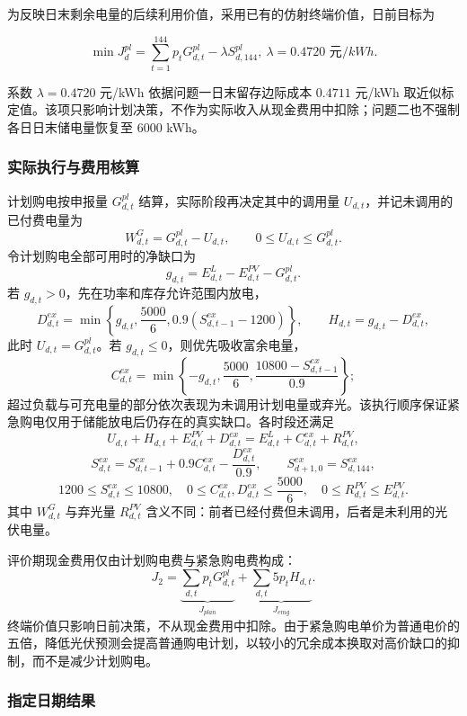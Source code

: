 \documentclass[withoutpreface,bwprint]{cumcmthesis}
\begin{document}
为反映日末剩余电量的后续利用价值，采用已有的仿射终端价值，日前目标为

\begin{equation}\min J_{d}^{pl} = \sum_{t = 1}^{144}p_{t}G_{d,t}^{pl} - \lambda S_{d,144}^{pl},\ \lambda = 0.4720\text{~元}/kWh.\end{equation}

系数 \(\lambda=0.4720\) 元/kWh 依据问题一日末留存边际成本 \(0.4711\) 元/kWh 取近似标定值。该项只影响计划决策，不作为实际收入从现金费用中扣除；问题二也不强制各日日末储电量恢复至 6000 kWh。

\subsubsection{实际执行与费用核算}

计划购电按申报量 \(G_{d,t}^{pl}\) 结算，实际阶段再决定其中的调用量
\(U_{d,t}\)，并记未调用的已付费电量为
\[
W_{d,t}^{G}=G_{d,t}^{pl}-U_{d,t},\qquad 0\le U_{d,t}\le G_{d,t}^{pl}.
\]
令计划购电全部可用时的净缺口为
\[
g_{d,t}=E_{d,t}^{L}-E_{d,t}^{PV}-G_{d,t}^{pl}.
\]
若 \(g_{d,t}>0\)，先在功率和库存允许范围内放电，
\[
D_{d,t}^{ex}=\min\left\{g_{d,t},\frac{5000}{6},
0.9\left(S_{d,t-1}^{ex}-1200\right)\right\},\qquad
H_{d,t}=g_{d,t}-D_{d,t}^{ex},
\]
此时 \(U_{d,t}=G_{d,t}^{pl}\)。若 \(g_{d,t}\le0\)，则优先吸收富余电量，
\[
C_{d,t}^{ex}=\min\left\{-g_{d,t},\frac{5000}{6},
\frac{10800-S_{d,t-1}^{ex}}{0.9}\right\};
\]
超过负载与可充电量的部分依次表现为未调用计划电量或弃光。该执行顺序保证紧急购电仅用于储能放电后仍存在的真实缺口。各时段还满足
\[
U_{d,t}+H_{d,t}+E_{d,t}^{PV}+D_{d,t}^{ex}
=E_{d,t}^{L}+C_{d,t}^{ex}+R_{d,t}^{PV},
\]
\[
S_{d,t}^{ex}=S_{d,t-1}^{ex}+0.9C_{d,t}^{ex}
-\frac{D_{d,t}^{ex}}{0.9},\qquad
S_{d+1,0}^{ex}=S_{d,144}^{ex},
\]
\[
1200\le S_{d,t}^{ex}\le10800,\quad
0\le C_{d,t}^{ex},D_{d,t}^{ex}\le\frac{5000}{6},\quad
0\le R_{d,t}^{PV}\le E_{d,t}^{PV}.
\]
其中 \(W_{d,t}^{G}\) 与弃光量 \(R_{d,t}^{PV}\) 含义不同：前者已经付费但未调用，后者是未利用的光伏电量。

评价期现金费用仅由计划购电费与紧急购电费构成：
\[
J_{2}=\underbrace{\sum_{d,t}p_tG_{d,t}^{pl}}_{J_{plan}}
+\underbrace{\sum_{d,t}5p_tH_{d,t}}_{J_{emg}}.
\]
终端价值只影响日前决策，不从现金费用中扣除。由于紧急购电单价为普通电价的五倍，降低光伏预测会提高普通购电计划，以较小的冗余成本换取对高价缺口的抑制，而不是减少计划购电。
\subsubsection{指定日期结果}
\end{document}
